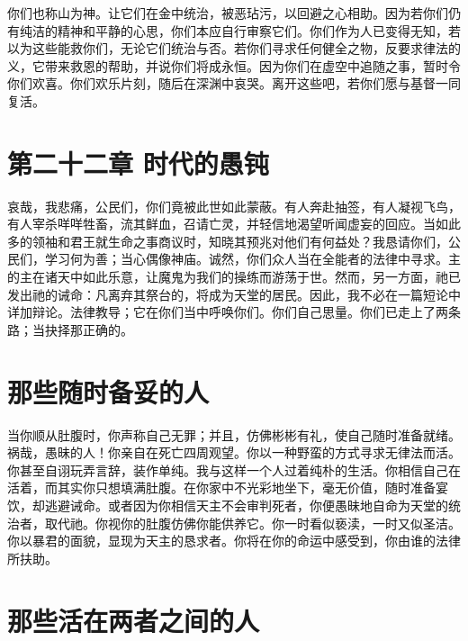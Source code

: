 你们也称山为神。让它们在金中统治，被恶玷污，以回避之心相助。因为若你们仍有纯洁的精神和平静的心思，你们本应自行审察它们。你们作为人已变得无知，若以为这些能救你们，无论它们统治与否。若你们寻求任何健全之物，反要求律法的义，它带来救恩的帮助，并说你们将成永恒。因为你们在虚空中追随之事，暂时令你们欢喜。你们欢乐片刻，随后在深渊中哀哭。离开这些吧，若你们愿与基督一同复活。\par


\section{第二十二章 时代的愚钝}

哀哉，我悲痛，公民们，你们竟被此世如此蒙蔽。有人奔赴抽签，有人凝视飞鸟，有人宰杀咩咩牲畜，流其鲜血，召请亡灵，并轻信地渴望听闻虚妄的回应。当如此多的领袖和君王就生命之事商议时，知晓其预兆对他们有何益处？我恳请你们，公民们，学习何为善；当心偶像神庙。诚然，你们众人当在全能者的法律中寻求。主的主在诸天中如此乐意，让魔鬼为我们的操练而游荡于世。然而，另一方面，祂已发出祂的诫命：凡离弃其祭台的，将成为天堂的居民。因此，我不必在一篇短论中详加辩论。法律教导；它在你们当中呼唤你们。你们自己思量。你们已走上了两条路；当抉择那正确的。\par


\section{那些随时备妥的人}

当你顺从肚腹时，你声称自己无罪；并且，仿佛彬彬有礼，使自己随时准备就绪。祸哉，愚昧的人！你亲自在死亡四周观望。你以一种野蛮的方式寻求无律法而活。你甚至自诩玩弄言辞，装作单纯。我与这样一个人过着纯朴的生活。你相信自己在活着，而其实你只想填满肚腹。在你家中不光彩地坐下，毫无价值，随时准备宴饮，却逃避诫命。或者因为你相信天主不会审判死者，你便愚昧地自命为天堂的统治者，取代祂。你视你的肚腹仿佛你能供养它。你一时看似亵渎，一时又似圣洁。你以暴君的面貌，显现为天主的恳求者。你将在你的命运中感受到，你由谁的法律所扶助。\par


\section{那些活在两者之间的人}

